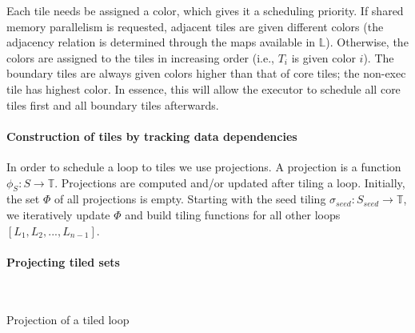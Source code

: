 Each tile needs be assigned a color, which gives it a scheduling priority. If shared memory parallelism is requested, adjacent tiles are given different colors (the adjacency relation is determined through the maps available in $\mathbb{L}$). Otherwise, the colors are assigned to the tiles in increasing order (i.e., $T_i$ is given color $i$). The boundary tiles are always given colors higher than that of core tiles; the non-exec tile has highest color. In essence, this will allow the executor to schedule all core tiles first and all boundary tiles afterwards. 

\paragraph{Construction of tiles by tracking data dependencies}
In order to schedule a loop to tiles we use projections. A projection is a function $\phi_S : S \rightarrow \mathbb{T}$. Projections are computed and/or updated after tiling a loop. Initially, the set $\Phi$ of all projections is empty. Starting with the seed tiling $\sigma_{seed} : S_{seed} \rightarrow \mathbb{T}$, we iteratively update $\Phi$ and build tiling functions for all other loops $[L_1, L_2, ..., L_{n-1}]$. 

\paragraph{Projecting tiled sets}

\begin{algorithm}[t]
\nonl ~\\
\caption{Projection of a tiled loop}
\label{algo:st-projection}
\end{algorithm}

